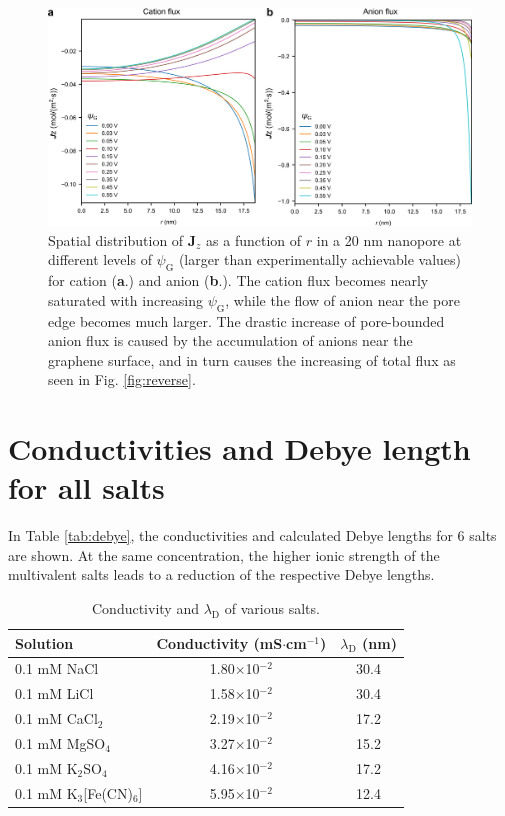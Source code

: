 \documentclass[manuscript=suppinfo,email=true, hyperref=true, keywords=false]{achemso}
\newcommand{\Fig}{Fig.}
\begin{document}
\begin{figure}[htbp]
  \centering
  \includegraphics[width=0.8\linewidth]{img/SI-flux-larger.png}
  \caption{Spatial distribution of $\boldsymbol{J}_{z}$ as a function
    of $r$ in a 20 nm nanopore at different levels of
    $\psi_{\mathrm{G}}$ (larger than experimentally achievable values)
    for cation (\textbf{a}.) and anion (\textbf{b}.). The cation flux
    becomes nearly saturated with increasing $\psi_{\mathrm{G}}$,
    while the flow of anion near the pore edge becomes much
    larger. The drastic increase of pore-bounded anion flux is caused
    by the accumulation of anions near the graphene surface, and in
    turn causes the increasing of total flux as seen in \Fig
    \ref{fig:reverse}.}
  \label{fig:large-V}
\end{figure}
\clearpage{}

\section{Conductivities and Debye length for all salts}
\label{sec:salts}
In Table \ref{tab:debye}, the conductivities and calculated Debye
lengths for 6 salts are shown. At the same concentration, the higher
ionic strength of the multivalent salts leads to a reduction of the
respective Debye lengths.

\begin{table}[htbp]
  \centering
  \begin{tabular}{lcc}
    \hline
    Solution & Conductivity (mS$\cdot$cm$^{-1}$) & $\lambda_{\mathrm{D}}$ (nm) \\
    \hline
    0.1 mM NaCl &1.80$\times$10$^{-2}$  &30.4\\
    0.1 mM LiCl &1.58$\times$10$^{-2}$ &30.4\\
    0.1 mM CaCl$_{2}$&  2.19$\times$10$^{-2}$ &17.2\\
    0.1 mM MgSO$_{4}$   &3.27$\times$10$^{-2}$ &15.2\\
    0.1 mM K$_{2}$SO$_{4}$      &4.16$\times$10$^{-2}$ &17.2\\
    0.1 mM K$_{3}$[Fe(CN)$_{6}$]&       5.95$\times$10$^{-2}$  &12.4\\
    \hline
  \end{tabular}
  \caption{Conductivity and $\lambda_{\mathrm{D}}$ of various salts.}
  \label{tab:conductivity}
\end{table}


\section*{}
\label{sec:ref}

\end{document}
